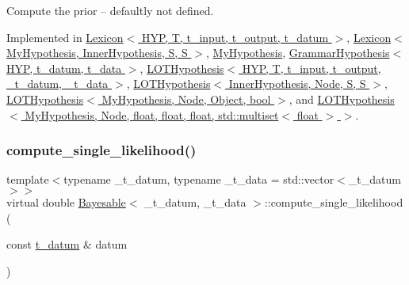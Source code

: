 Compute the prior -- defaultly not defined. 



Implemented in \hyperlink{class_lexicon_a1ac27e460a361cc90566b92365909324}{Lexicon$<$ H\+Y\+P, T, t\+\_\+input, t\+\_\+output, t\+\_\+datum $>$}, \hyperlink{class_lexicon_a1ac27e460a361cc90566b92365909324}{Lexicon$<$ My\+Hypothesis, Inner\+Hypothesis, S, S $>$}, \hyperlink{class_my_hypothesis_a67752bb4ba61994ef0cb64f7f9031f7f}{My\+Hypothesis}, \hyperlink{class_grammar_hypothesis_a11fd75eee387330535601c9ee9d2f0f9}{Grammar\+Hypothesis$<$ H\+Y\+P, t\+\_\+datum, t\+\_\+data $>$}, \hyperlink{class_l_o_t_hypothesis_ae0ea0b1cd5f7a89ef86f440276f04c4e}{L\+O\+T\+Hypothesis$<$ H\+Y\+P, T, t\+\_\+input, t\+\_\+output, \+\_\+t\+\_\+datum, \+\_\+t\+\_\+data $>$}, \hyperlink{class_l_o_t_hypothesis_ae0ea0b1cd5f7a89ef86f440276f04c4e}{L\+O\+T\+Hypothesis$<$ Inner\+Hypothesis, Node, S, S $>$}, \hyperlink{class_l_o_t_hypothesis_ae0ea0b1cd5f7a89ef86f440276f04c4e}{L\+O\+T\+Hypothesis$<$ My\+Hypothesis, Node, Object, bool $>$}, and \hyperlink{class_l_o_t_hypothesis_ae0ea0b1cd5f7a89ef86f440276f04c4e}{L\+O\+T\+Hypothesis$<$ My\+Hypothesis, Node, float, float, float, std\+::multiset$<$ float $>$ $>$}.

\mbox{\label{class_bayesable_a5e0237ec7a40a2c45c990f93a8dc8e00}} 
\subsubsection{\texorpdfstring{compute\+\_\+single\+\_\+likelihood()}{compute\_single\_likelihood()}}
{\footnotesize\ttfamily template$<$typename \+\_\+t\+\_\+datum, typename \+\_\+t\+\_\+data = std\+::vector$<$\+\_\+t\+\_\+datum$>$$>$ \\
virtual double \hyperlink{class_bayesable}{Bayesable}$<$ \+\_\+t\+\_\+datum, \+\_\+t\+\_\+data $>$\+::compute\+\_\+single\+\_\+likelihood (\begin{DoxyParamCaption}\item[{const \hyperlink{class_bayesable_a7c93a2eeab708378eb321745908718d4}{t\+\_\+datum} \&}]{datum }\end{DoxyParamCaption})\hspace{0.3cm}{\ttfamily [pure virtual]}}



